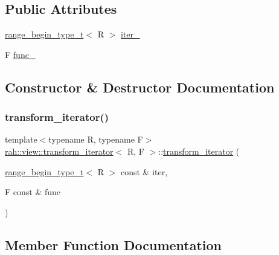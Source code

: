 \subsection*{Public Attributes}
\begin{DoxyCompactItemize}
\item 
\mbox{\hyperlink{namespacerah_a28aff4eeddcece6be65ff0b956d32d4a}{range\+\_\+begin\+\_\+type\+\_\+t}}$<$ R $>$ \mbox{\hyperlink{structrah_1_1view_1_1transform__iterator_ac3c20401254ca24682913ba0e9c56284}{iter\+\_\+}}
\item 
F \mbox{\hyperlink{structrah_1_1view_1_1transform__iterator_a02ac2e8035d0b7917ee44967069def0d}{func\+\_\+}}
\end{DoxyCompactItemize}


\subsection{Constructor \& Destructor Documentation}
\mbox{\label{structrah_1_1view_1_1transform__iterator_ae8f127be961b14896c87d94e710a9a1a}} 
\subsubsection{\texorpdfstring{transform\_iterator()}{transform\_iterator()}}
{\footnotesize\ttfamily template$<$typename R, typename F$>$ \\
\mbox{\hyperlink{structrah_1_1view_1_1transform__iterator}{rah\+::view\+::transform\+\_\+iterator}}$<$ R, F $>$\+::\mbox{\hyperlink{structrah_1_1view_1_1transform__iterator}{transform\+\_\+iterator}} (\begin{DoxyParamCaption}\item[{\mbox{\hyperlink{namespacerah_a28aff4eeddcece6be65ff0b956d32d4a}{range\+\_\+begin\+\_\+type\+\_\+t}}$<$ R $>$ const \&}]{iter,  }\item[{F const \&}]{func }\end{DoxyParamCaption})\hspace{0.3cm}{\ttfamily [inline]}}



\subsection{Member Function Documentation}
\mbox{\label{structrah_1_1view_1_1transform__iterator_a56c602664659b11bfca3da418c6977be}} 
